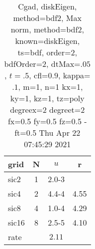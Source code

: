 \begin{table}[H]\tableFont %
\begin{center}
\begin{tabular}{|l|c|c|c|} \hline 
grid  & N &  $ u $ & r \\ \hline 
      sic2 &     1 & \num{2.0}{-3} &        \\ \hline
      sic4 &     2 & \num{4.4}{-4} &  4.55  \\ \hline
      sic8 &     4 & \num{1.0}{-4} &  4.29  \\ \hline
     sic16 &     8 & \num{2.5}{-5} &  4.10  \\ \hline
    rate             &       &  $2.11$       &       \\ \hline
\end{tabular}
\caption{Cgad, diskEigen, method=bdf2, Max norm, method=bdf2, known=diskEigen, ts=bdf, order=$2$, bdfOrder=2, dtMax=$.05$, $t=.5$, cfl=$0.9$, kappa=$.1$, m=1, n=1 kx=1, ky=1, kz=1,  tz=poly degreex=2 degreet=2 fx=0.5 fy=0.5 fz=0.5 -ft=0.5 Thu Apr 22 07:45:29 2021}\label{table:diskEigenbdf2Order2Max}
\end{center}
\end{table}
